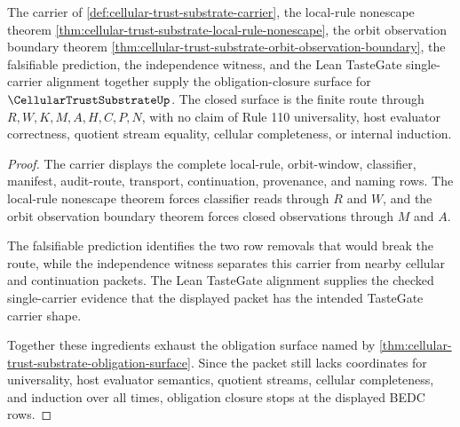\begin{theorem}
\label{thm:cellular-trust-substrate-obligation-closure}
The carrier of \autoref{def:cellular-trust-substrate-carrier}, the local-rule nonescape theorem \autoref{thm:cellular-trust-substrate-local-rule-nonescape}, the orbit observation boundary theorem \autoref{thm:cellular-trust-substrate-orbit-observation-boundary}, the falsifiable prediction, the independence witness, and the Lean TasteGate single-carrier alignment together supply the obligation-closure surface for $\CellularTrustSubstrateUp$. The closed surface is the finite route through $R,W,K,M,A,H,C,P,N$, with no claim of Rule 110 universality, host evaluator correctness, quotient stream equality, cellular completeness, or internal induction.
\end{theorem}
\begin{proof}
The carrier displays the complete local-rule, orbit-window, classifier, manifest, audit-route, transport, continuation, provenance, and naming rows. The local-rule nonescape theorem forces classifier reads through $R$ and $W$, and the orbit observation boundary theorem forces closed observations through $M$ and $A$.

The falsifiable prediction identifies the two row removals that would break the route, while the independence witness separates this carrier from nearby cellular and continuation packets. The Lean TasteGate alignment supplies the checked single-carrier evidence that the displayed packet has the intended TasteGate carrier shape.

Together these ingredients exhaust the obligation surface named by \autoref{thm:cellular-trust-substrate-obligation-surface}. Since the packet still lacks coordinates for universality, host evaluator semantics, quotient streams, cellular completeness, and induction over all times, obligation closure stops at the displayed BEDC rows.
\end{proof}

